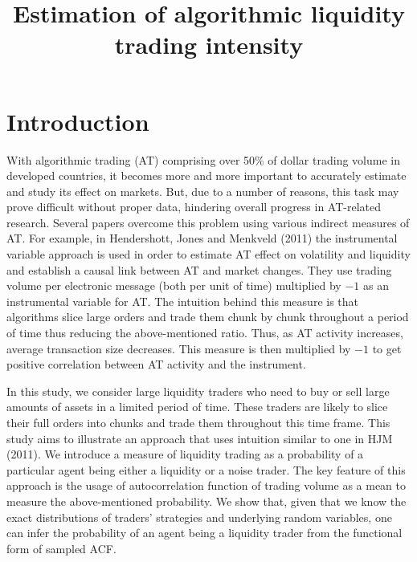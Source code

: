 \documentclass[12pt]{article}
\author{}
\date{}
\title{Estimation of algorithmic liquidity trading intensity}
\begin{document}
\maketitle
\newpage
\tableofcontents
\newpage

\section{Introduction}\label{sec:intro}
With algorithmic trading (AT) comprising over 50\% of dollar trading volume in developed countries, it becomes more and more important to accurately estimate and study its effect on markets. But, due to a number of reasons, this task may prove difficult without proper data, hindering overall progress in AT-related research. 
Several papers overcome this problem using various indirect measures of AT. For example, in Hendershott, Jones and Menkveld (2011) the instrumental variable approach is used in order to estimate AT effect on volatility and liquidity and establish a causal link between AT and market changes. They use trading volume per electronic message (both per unit of time) multiplied by $-1$ as an instrumental variable for AT. The intuition behind this measure is that algorithms slice large orders and trade them chunk by chunk throughout a period of time thus reducing the above-mentioned ratio. Thus, as AT activity increases, average transaction size decreases. This measure is then multiplied by $-1$ to get positive correlation between AT activity and the instrument.

In this study, we consider large liquidity traders who need to buy or sell large amounts of assets in a limited period of time. These traders are likely to slice their full orders into chunks and trade them throughout this time frame. This study aims to illustrate an approach that uses intuition similar to one in HJM (2011). We introduce a measure of liquidity trading as a probability of a particular agent being either a liquidity or a noise trader. The key feature of this approach is the usage of autocorrelation function of trading volume as a mean to measure the above-mentioned probability. We show that, given that we know the exact distributions of traders' strategies and underlying random variables, one can infer the probability of an agent being a liquidity trader from the functional form of sampled ACF.
\newpage
\end{document}
